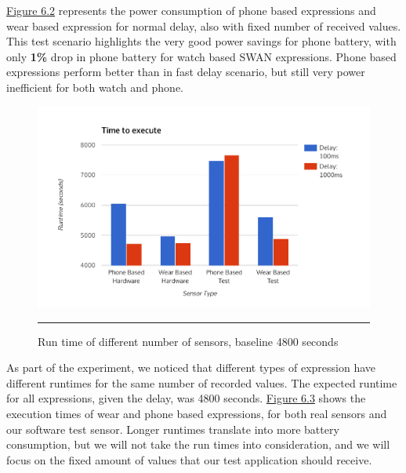 \hyperref[fig:phone_vs_wear_1000]{Figure 6.2} represents the power consumption of phone based expressions and wear based expression for normal delay, also
with fixed number of received values. This test scenario highlights the very good power savings for phone battery, with only \textbf{1\%} drop in phone battery for watch based SWAN
expressions. Phone based expressions perform better than in fast delay scenario, but still very power inefficient for both watch and phone.

 \begin{figure}[htbp]
  \centering
    \includegraphics[scale=0.8]{Figures/execution_times.pdf}
    \rule{35em}{0.5pt}
  \caption[Run time of different number of sensors, baseline 4800 seconds]{Run time of different number of sensors, baseline 4800 seconds}
  \label{fig:execution_times}
\end{figure}

As part of the experiment, we noticed that different types of expression have different runtimes for the same number of recorded values. The expected runtime for all expressions,
given the delay, was 4800 seconds. \hyperref[fig:execution_times]{Figure 6.3} shows the execution times of wear and phone based expressions, for both real sensors and our software test sensor.
Longer runtimes translate into more battery consumption, but we will not take the run times into consideration, and we will focus on the fixed amount of values that our test application should receive.

